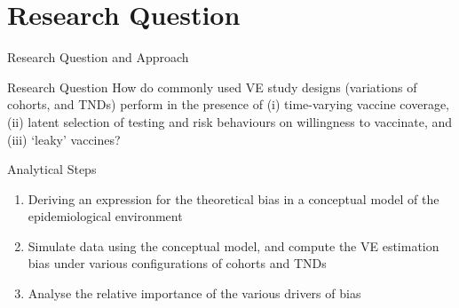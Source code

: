 \documentclass[aspectratio=169]{beamer}
\begin{document}
\section{Research Question}
\begin{frame}{Research Question and Approach}
	\begin{block}{Research Question}
		How do commonly used VE study designs (variations of cohorts, and TNDs) perform in the presence of (i) time-varying vaccine coverage, (ii) latent selection of testing and risk behaviours on willingness to vaccinate, and (iii) `leaky' vaccines?
	\end{block}
	\begin{block}{Analytical Steps}
		\begin{enumerate}
			\item Deriving an expression for the theoretical bias in a conceptual model of the epidemiological environment
			\item Simulate data using the conceptual model, and compute the VE estimation bias under various configurations of cohorts and TNDs
			\item Analyse the relative importance of the various drivers of bias
		\end{enumerate}
	\end{block}
\end{frame}
\end{document}
